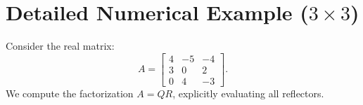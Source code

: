 \FloatBarrier
\section[Detailed Numerical Example (3x3)]{Detailed Numerical Example (\texorpdfstring{$3 \times 3$}{3x3})}
\label{sec:numerical-example-3x3-en}

\begin{example}
Consider the real matrix:
\begin{equation}
    A = \begin{bmatrix} 
    4 & -5 & -4 \\ 
    3 & 0 & 2 \\ 
    0 & 4 & -3 
    \end{bmatrix}.
\end{equation}
We compute the factorization $A = QR$, explicitly evaluating all reflectors.


\end{example}
